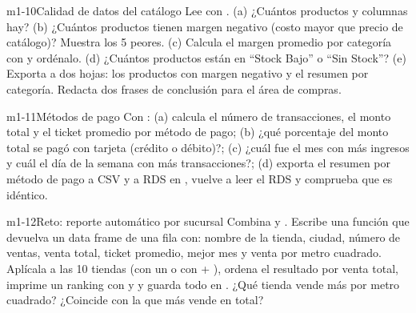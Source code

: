 \begin{ejercicio}{m1-10}{Calidad de datos del catálogo}
Lee  con . (a) ¿Cuántos
productos y columnas hay? (b) ¿Cuántos productos tienen margen negativo
(costo mayor que precio de catálogo)? Muestra los 5 peores. (c) Calcula el
margen promedio por categoría con  y ordénalo. (d)
¿Cuántos productos están en ``Stock Bajo'' o ``Sin Stock''? (e) Exporta a
 dos hojas: los productos con
margen negativo y el resumen por categoría. Redacta dos frases de
conclusión para el área de compras.
\end{ejercicio}

\begin{ejercicio}{m1-11}{Métodos de pago}
Con : (a) calcula el número de
transacciones, el monto total y el ticket promedio por método de pago; (b)
¿qué porcentaje del monto total se pagó con tarjeta (crédito o débito)?;
(c) ¿cuál fue el mes con más ingresos y cuál el día de la semana con más
transacciones?; (d) exporta el resumen por método de pago a CSV y a RDS en
, vuelve a leer el RDS y comprueba que es idéntico.
\end{ejercicio}

\begin{ejercicio}{m1-12}{Reto: reporte automático por sucursal}
Combina  y
. Escribe una función
 que devuelva un data frame de
una fila con: nombre de la tienda, ciudad, número de ventas, venta total,
ticket promedio, mejor mes y venta por metro cuadrado. Aplícala a las 10
tiendas (con un  o con  +
), ordena el resultado por venta total,
imprime un ranking con  y  y guarda todo en
. ¿Qué tienda vende más por metro
cuadrado? ¿Coincide con la que más vende en total?
\end{ejercicio}

